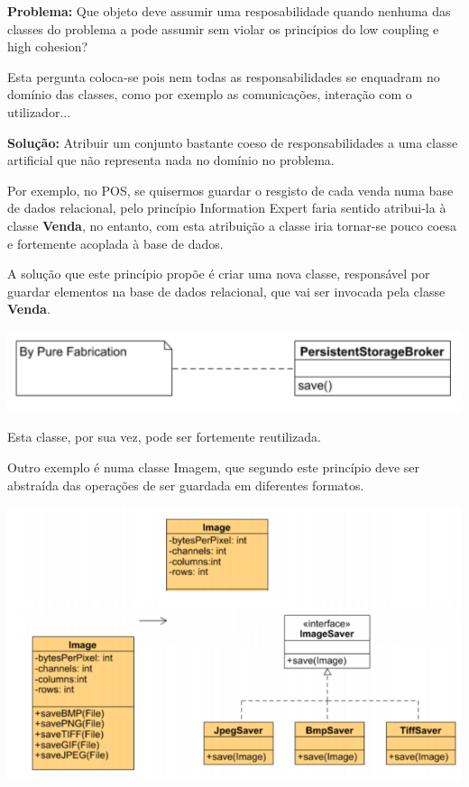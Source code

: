 \documentclass{article}
\begin{document}
\begin{flushleft}
    \textbf{Problema:} Que objeto deve assumir uma resposabilidade quando nenhuma das classes
    do problema a pode assumir sem violar os princípios do low coupling e high
    cohesion?

    Esta pergunta coloca-se pois nem todas as responsabilidades se enquadram no domínio das classes, como
    por exemplo as comunicações, interação com o utilizador...

    \vspace{3mm}
    \textbf{Solução:} Atribuir um conjunto bastante coeso de responsabilidades a uma classe artificial que
    não representa nada no domínio no problema.
\end{flushleft}

\begin{flushleft}
    Por exemplo, no POS, se quisermos guardar o resgisto de cada venda numa base de dados relacional, pelo
    princípio Information Expert faria sentido atribui-la à classe \textbf{Venda}, no entanto, com esta atribuição a
    classe iria tornar-se pouco coesa e fortemente acoplada à base de dados.

    A solução que este princípio propõe é criar uma nova classe, responsável por guardar elementos na base
    de dados relacional, que vai ser invocada pela classe \textbf{Venda}.
    \begin{center}
        \includegraphics[scale=0.4]{Images/19.png}
    \end{center}

    Esta classe, por sua vez, pode ser fortemente reutilizada.

    Outro exemplo é numa classe Imagem, que segundo este princípio deve ser abstraída das operações de
    ser guardada em diferentes formatos.

    \begin{center}
        \includegraphics[scale=0.4]{Images/20.png}
    \end{center}
\end{flushleft}
\end{document}
